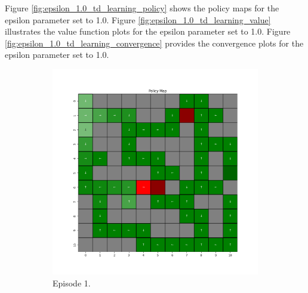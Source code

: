 \documentclass{assignment}
\begin{document}
Figure \ref{fig:epsilon_1.0_td_learning_policy} shows the policy maps for the epsilon parameter set to 1.0. Figure \ref{fig:epsilon_1.0_td_learning_value} illustrates the value function plots for the epsilon parameter set to 1.0. Figure \ref{fig:epsilon_1.0_td_learning_convergence} provides the convergence plots for the epsilon parameter set to 1.0.

\begin{figure}[H]
    \begin{subfigure}{0.3\textwidth}
        \includegraphics[width=\textwidth]{figures/policy_td/epsilon_sweep/policy_alpha_0.1_gamma_0.95_epsilon_1.0_iteration_1.png}
    \caption{Episode 1.}
    \end{subfigure}\hfill
    \begin{subfigure}{0.3\textwidth}

\end{subfigure}
\end{figure}
\end{document}

